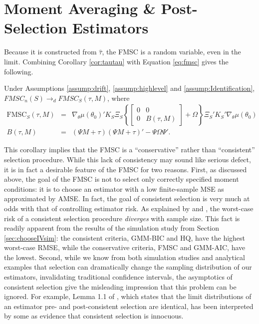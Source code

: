 \section{Moment Averaging \& Post-Selection Estimators}
\label{sec:avg}
Because it is constructed from $\widehat{\tau}$, the FMSC is a random variable, even in the limit.
Combining Corollary \ref{cor:tautau} with Equation \ref{eq:fmsc} gives the following.
\begin{cor}
\label{cor:FMSClimit}
	Under Assumptions \ref{assump:drift}, \ref{assump:highlevel} and \ref{assump:Identification}, $FMSC_n(S) \rightarrow_d FMSC_S(\tau, M)$, where
	\begin{eqnarray*}
		\mbox{FMSC}_S(\tau,M) &=& \nabla_\theta\mu(\theta_0)'K_S\Xi_S \left\{\left[\begin{array}{cc}0&0\\0& B(\tau,M) \end{array}\right] + \Omega\right\}\Xi_S'K_S'\nabla_\theta\mu(\theta_0)\\
		B(\tau,M) &=& (\Psi M + \tau)(\Psi M + \tau)' - \Psi \Omega \Psi'.
	\end{eqnarray*}
\end{cor}
This corollary implies that the FMSC is a ``conservative'' rather than ``consistent'' selection procedure.
While this lack of consistency may sound like serious defect, it is in fact a desirable feature of the FMSC for two reasons.
First, as discussed above, the goal of the FMSC is not to select only correctly specified moment conditions: it is to choose an estimator with a low finite-sample MSE as approximated by AMSE.
In fact, the goal of consistent selection is very much at odds with that of controlling estimator risk.
As explained by \cite{Yang2005} and \cite{LeebPoetscher2008}, the worst-case risk of a consistent selection procedure \emph{diverges} with sample size. 
This fact is readily apparent from the results of the simulation study from Section \ref{sec:chooseIVsim}: the consistent criteria, GMM-BIC and HQ, have the highest worst-case RMSE, while the conservative criteria, FMSC and GMM-AIC, have the lowest.
Second, while we know from both simulation studies \citep{Demetrescu} and analytical examples \citep{LeebPoetscher2005} that selection can dramatically change the sampling distribution of our estimators, invalidating traditional confidence intervals, the asymptotics of consistent selection give the misleading impression that this problem can be ignored.
For example, Lemma 1.1 of \citet[p.\ 168]{Poetscher1991}, which states that the limit distributions of an estimator pre- and post-consistent selection are identical, has been interpreted by some as evidence that consistent selection is innocuous. 
